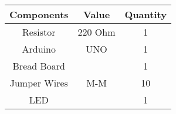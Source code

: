 
\begin{tabular}{|c|c|c|}
\hline
Components & Value & Quantity\\
\hline
Resistor & 220 Ohm & 1\\
\hline
Arduino & UNO & 1\\
\hline
Bread Board & & 1\\
\hline
Jumper Wires & M-M & 10\\
\hline
LED & & 1\\
\hline
\end{tabular}
